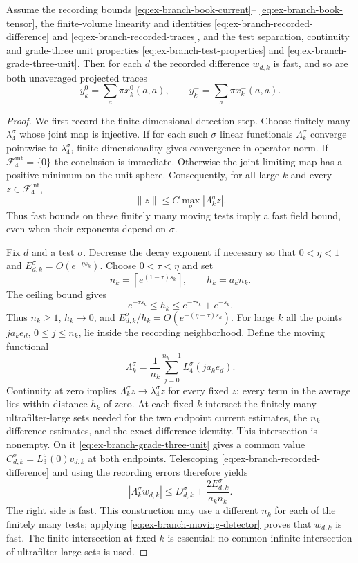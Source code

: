 \begin{proposition}
\label{prop:ex-branch-raw-fast}
Assume the recording bounds \eqref{eq:ex-branch-book-current}--
\eqref{eq:ex-branch-book-tensor}, the finite-volume linearity and identities
\eqref{eq:ex-branch-recorded-difference} and
\eqref{eq:ex-branch-recorded-traces}, and the test separation, continuity
and grade-three unit properties \eqref{eq:ex-branch-test-properties} and
\eqref{eq:ex-branch-grade-three-unit}. Then for each $d$ the recorded difference
$w_{d,k}$ is fast, and so are both unaveraged projected traces
\[
 y^0_k=\sum_a\pi x^0_k(a,a),\qquad
 y^-_k=\sum_a\pi x^-_k(a,a).
\]
\end{proposition}
\begin{proof}
We first record the finite-dimensional detection step. Choose finitely many
$\lambda^{\sigma}_4$ whose joint map is injective. If for each such $\sigma$ linear
functionals $\Lambda^{\sigma}_k$ converge pointwise to $\lambda^{\sigma}_4$, finite
dimensionality gives convergence in operator norm. If $\mathcal F_4^{\mathrm{int}}=\{0\}$ the conclusion is immediate. Otherwise the joint
limiting map has a positive minimum on the unit sphere. Consequently, for all large
$k$ and every $z\in\mathcal F_4^{\mathrm{int}}$,
\begin{equation}
 \|z\|\le C\max_\sigma|\Lambda^{\sigma}_k z|.
 \label{eq:ex-branch-moving-detector}
\end{equation}
Thus fast bounds on these finitely many moving tests imply a fast field
bound, even when their exponents depend on $\sigma$.

Fix $d$ and a test $\sigma$. Decrease the decay exponent if necessary so that
$0<\eta<1$ and $E^{\sigma}_{d,k}=O(e^{-\eta s_k})$. Choose
$0<\tau<\eta$ and set
\[
 n_k=\left\lceil e^{(1-\tau)s_k}\right\rceil,\qquad
 h_k=a_kn_k.
\]
The ceiling bound gives
\[
 e^{-\tau s_k}\le h_k
 \le e^{-\tau s_k}+e^{-s_k}.
\]
Thus $n_k\ge1$, $h_k\to0$, and
$E^{\sigma}_{d,k}/h_k=O(e^{-(\eta-\tau)s_k})$. For large $k$ all the
points $ja_ke_d$, $0\le j\le n_k$, lie inside the recording
neighborhood. Define the moving functional
\[
 \Lambda^{\sigma}_k=\frac1{n_k}\sum_{j=0}^{n_k-1}L^{\sigma}_4(ja_ke_d).
\]
Continuity at zero implies $\Lambda^{\sigma}_k z\to\lambda^{\sigma}_4z$ for every
fixed $z$: every term in the average lies within distance $h_k$ of
zero. At each fixed $k$ intersect the finitely many ultrafilter-large sets
needed for the two endpoint current estimates, the $n_k$ difference
estimates, and the exact difference identity. This intersection is
nonempty. On it \eqref{eq:ex-branch-grade-three-unit} gives a common value
$C_{d,k}^{\sigma}=L^{\sigma}_3(0)v_{d,k}$ at both endpoints. Telescoping
\eqref{eq:ex-branch-recorded-difference} and using the recording errors
therefore yields
\[
 |\Lambda^{\sigma}_k w_{d,k}|
 \le D^{\sigma}_{d,k}+\frac{2E^{\sigma}_{d,k}}{a_kn_k}.
\]
The right side is fast. This construction may use a different $n_k$ for
each of the finitely many tests; applying
\eqref{eq:ex-branch-moving-detector} proves that $w_{d,k}$ is fast.
The finite intersection at fixed $k$ is essential: no common infinite
intersection of ultrafilter-large sets is used.


\end{proof}
